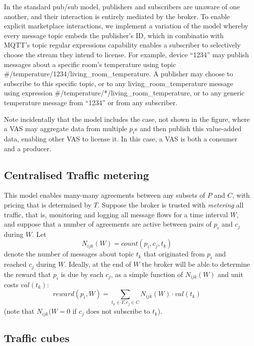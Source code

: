 \documentclass[conference]{IEEEtran}
\begin{document}
In the standard pub/sub model, publishers and subscribers are unaware of one another, and their interaction is entirely mediated by the broker. 
To enable explicit marketplace interactions, we implement a variation of the model whereby every message topic embeds the publisher's ID, which in combinatio with MQTT's topic regular expressions capability enables a subscriber to selectively choose the stream they intend to license.
For example, device ``1234'' may publish messages about a specific room's temperature using topic  \#/temperature/1234/living\_room\_temperature. 
A publisher may choose to subscribe to this specific topic, or to any  living\_room\_temperature message using expression \#/temperature/*/living\_room\_temperature, or to any generic temperature message from ``1234'' or from any subscriber.

Note incidentally that the model includes the case, not shown in the figure, where a VAS may aggregate data from multiple $ p_i $s and then publish this value-added data, enabling other VAS to license it. 
In this case, a VAS is both a consumer and a producer.

\subsection{Centralised Traffic metering}

This model enables many-many agreements between any subsets of $P$ and $C$, with pricing that is determined by $T$.
Suppose the broker is trusted with \textit{metering} all traffic, that is, monitoring and logging all message flows for a time interval $W$, and suppose that a number of agreements are active between pairs of $p_i$ and $c_j$ during $W$.
Let 
\[N_{ijk}(W) = \mathit{count}(p_i, c_j, t_k)\]
denote the number of messages about topic $t_k$ that originated from $p_i$ and reached $c_j$ during $W$.
Ideally, at the end of $W$ the broker will be able to determine the reward that $p_i$ is due by each $c_j$, as a simple function of $N_{ijk}(W)$ and unit costs $\mathit{val}(t_k)$:
\begin{equation}
\mathit{reward}(p_i, W) = \sum_{t_k \in T, c_j \in C} N_{ijk}(W) \cdot \mathit{val}(t_k)
\label{eq:reward}
\end{equation}
(note that $N_{ijk}(W = 0$ if $c_j$ does not subscribe to $t_k$).

\subsection{Traffic cubes}
\end{document}

